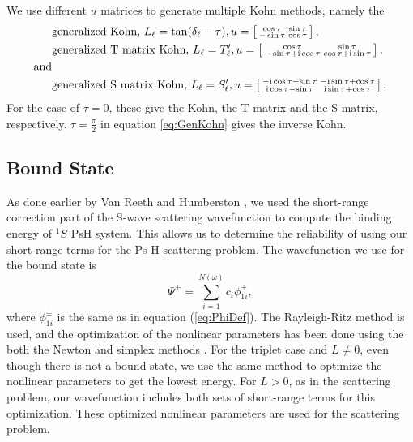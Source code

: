 \documentclass[preprint,showpacs,preprintnumbers,amsmath,amssymb]{revtex4}
\newcommand{\ii}{{\rm{i}}}
\begin{document}

We use different $u$ matrices to generate multiple Kohn methods, namely the
\begin{align}
&\text{generalized Kohn, } L_\ell = \tan(\delta_\ell-\tau), u = \left[ \begin{smallmatrix}
\cos \tau & \sin \tau \\  -\sin \tau & \cos \tau
\end{smallmatrix} \right], \label{eq:GenKohn}\\
&\text{generalized T matrix Kohn, } L_\ell = T_\ell^\prime, u = \left[ \begin{smallmatrix}
\cos\tau & \sin\tau \\ -\sin\tau + \ii \cos\tau & \cos\tau + \ii \sin\tau
\end{smallmatrix} \right], \label{eq:GenTKohn} \\
\text{and}& \nonumber \\
&\text{generalized S matrix Kohn, } L_\ell = S_\ell^\prime, u = \left[ \begin{smallmatrix}
-\ii \cos\tau - \sin\tau & -\ii\sin\tau + \cos\tau \\ \ii\cos\tau - \sin\tau & \ii\sin\tau + \cos\tau
\end{smallmatrix} \right]. \label{eq:GenSKohn}
\end{align}
For the case of $\tau = 0$, these give the Kohn, the T matrix and the S matrix, respectively. $\tau = \frac{\pi}{2}$ in equation \ref{eq:GenKohn} gives the inverse Kohn.


\subsection{Bound State}
As done earlier by Van Reeth and Humberston \cite{VanReeth2003,VanReeth2004}, we used the short-range correction part of the S-wave scattering wavefunction to compute the binding energy of $^1S$ PsH system. This allows us to determine the reliability of using our short-range terms for the Ps-H scattering problem. The wavefunction we use for the bound state is
\begin{equation}
\label{eq:BoundWavefn}
\Psi^\pm = \sum_{i=1}^{N(\omega)} c_i \phi_{1i}^\pm,
\end{equation}
where $\phi_{1i}^\pm$ is the same as in equation (\ref{eq:PhiDef}). The Rayleigh-Ritz method is used, and the optimization of the nonlinear parameters has been done using the both the Newton and simplex methods \cite{Yan1999,GSL}. For the triplet case and $L \neq 0$, even though there is not a bound state, we use the same method to optimize the nonlinear parameters to get the lowest energy. For $L > 0$, as in the scattering problem, our wavefunction includes both sets of short-range terms for this optimization. These optimized nonlinear parameters are used for the scattering problem.
\end{document}
